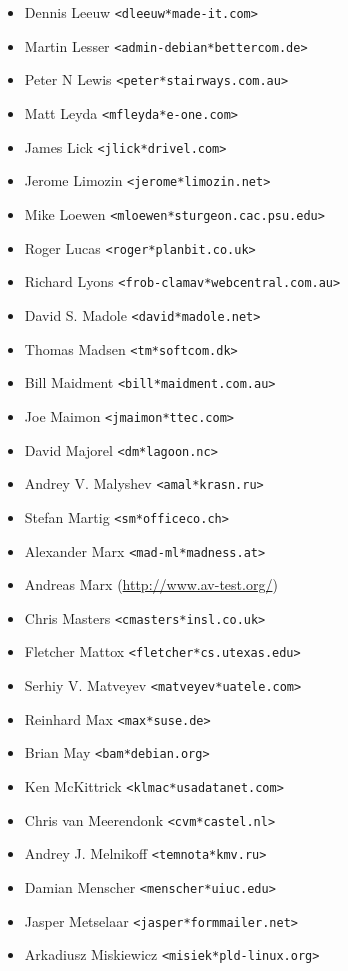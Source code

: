 \documentclass[a4paper,titlepage,12pt]{article}
\newcommand{\email}[1]{\texttt{#1}}
\begin{document}
\begin{itemize}
	\item Dennis Leeuw \email{<dleeuw*made-it.com>}
	\item Martin Lesser \email{<admin-debian*bettercom.de>}
	\item Peter N Lewis \email{<peter*stairways.com.au>}
	\item Matt Leyda \email{<mfleyda*e-one.com>}
	\item James Lick \email{<jlick*drivel.com>}
	\item Jerome Limozin \email{<jerome*limozin.net>}
	\item Mike Loewen \email{<mloewen*sturgeon.cac.psu.edu>}
	\item Roger Lucas \email{<roger*planbit.co.uk>}
	\item Richard Lyons \email{<frob-clamav*webcentral.com.au>}
	\item David S. Madole \email{<david*madole.net>}
	\item Thomas Madsen \email{<tm*softcom.dk>}
	\item Bill Maidment \email{<bill*maidment.com.au>}
	\item Joe Maimon \email{<jmaimon*ttec.com>}
	\item David Majorel \email{<dm*lagoon.nc>}
	\item Andrey V. Malyshev \email{<amal*krasn.ru>}
	\item Stefan Martig \email{<sm*officeco.ch>}
	\item Alexander Marx \email{<mad-ml*madness.at>}
	\item Andreas Marx (\url{http://www.av-test.org/})
	\item Chris Masters \email{<cmasters*insl.co.uk>}
	\item Fletcher Mattox \email{<fletcher*cs.utexas.edu>}
	\item Serhiy V. Matveyev \email{<matveyev*uatele.com>}
	\item Reinhard Max \email{<max*suse.de>}
	\item Brian May \email{<bam*debian.org>}
	\item Ken McKittrick \email{<klmac*usadatanet.com>}
	\item Chris van Meerendonk \email{<cvm*castel.nl>}
	\item Andrey J. Melnikoff \email{<temnota*kmv.ru>}
	\item Damian Menscher \email{<menscher*uiuc.edu>}
	\item Jasper Metselaar \email{<jasper*formmailer.net>}
	\item Arkadiusz Miskiewicz \email{<misiek*pld-linux.org>}

\end{itemize}
\end{document}

